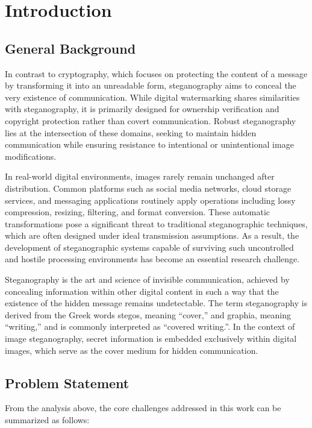 \documentclass[12pt,a4paper,oneside]{report}
\begin{document}
	\tableofcontents
	\newpage
	\listoffigures
	\listoftables
	
	\chapter{Introduction}
	
	\section{General Background} In contrast to cryptography, which focuses on protecting the content of a message by transforming it into an unreadable form, steganography aims to conceal the very existence of communication. While digital watermarking shares similarities with steganography, it is primarily designed for ownership verification and copyright protection rather than covert communication. Robust steganography lies at the intersection of these domains, seeking to maintain hidden communication while ensuring resistance to intentional or unintentional image modifications.
	
	In real-world digital environments, images rarely remain unchanged after distribution. Common platforms such as social media networks, cloud storage services, and messaging applications routinely apply operations including lossy compression, resizing, filtering, and format conversion. These automatic transformations pose a significant threat to traditional steganographic techniques, which are often designed under ideal transmission assumptions. As a result, the development of steganographic systems capable of surviving such uncontrolled and hostile processing environments has become an essential research challenge.
	
	
	Steganography is the art and science of invisible communication, achieved by concealing information within other digital content in such a way that the existence of the hidden message remains undetectable. The term steganography is derived from the Greek words stegos, meaning “cover,” and graphia, meaning “writing,” and is commonly interpreted as “covered writing.”\cite{moerland2005steganography}. In the context of image steganography, secret information is embedded exclusively within digital images, which serve as the cover medium for hidden communication.
	
	\section{Problem Statement}
	From the analysis above, the core challenges addressed in this work can be summarized as follows:
	
\end{document}
